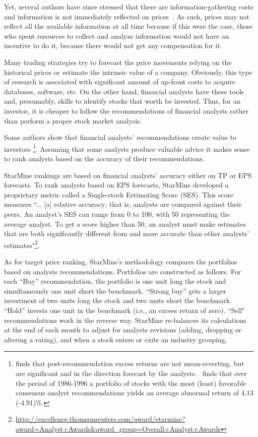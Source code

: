 \documentclass[12pt,a4paper]{article}\usepackage[]{graphicx}\usepackage[]{color}
\begin{document}
Yet, several authors have since stressed that  there are information-gathering costs and information is not immediately reflected on prices~\citep{grossman1980iie}. As such, prices may not  reflect all the available information at all time because if this were the case, those who spent resources to collect and analyze   information would not have an incentive to do it, because there would not get any compensation for it.

Many trading strategies try to forecast the price movements relying on the historical prices or estimate the intrinsic value of a company. Obviously, this type of research is associated with significant amount of up-front costs to acquire databases, software, etc. On the other hand, financial analysts have these tools and, presumably, skills to identify  stocks that worth be invested. Thus, for an investor, it is cheaper to follow the recommendations of financial analysts rather than perform a proper stock market analysis.


Some authors show that financial analysts' recommendations create value to investors \citep{womack1996,barber2001}\footnote{\cite{womack1996} finds that  post-recommendation excess returns are not mean-reverting, but are significant and in the direction forecast by the analysts.~\cite{barber2001} finds that over the period of 1986-1996 a portfolio of stocks with the most (least) favorable consensus analyst recommendations yields an average abnormal return of 4.13 (-4.91)\%.}. Assuming that some analysts produce valuable advice it makes sense to rank analysts based on the accuracy of their recommendations.

StarMine rankings are based on financial analysts' accuracy either on TP or EPS forecasts. To rank analysts based on EPS forecasts, StarMine developed a proprietary metric called a Single-stock Estimating Score (SES). This score measures ``... [a] relative accuracy; that is, analysts are compared against their peers. An analyst's SES can range from 0 to 100, with 50 representing the average analyst. To get a score higher than 50, an analyst must make estimates that are both significantly different from and more accurate than other analysts' estimates"\footnote{\url{http://excellence.thomsonreuters.com/award/starmine?award=Analyst+Awards&award_group=Overall+Analyst+Awards}}.


As for target price ranking, StarMine's methodology compares the portfolios based on analysts recommendations. Portfolios are constructed as follows. For each ``Buy'' recommendation, the portfolio is one unit long the stock and simultaneously one unit short the benchmark. ``Strong buy'' gets a larger investment of two units long the stock and two units short the benchmark. ``Hold'' invests one unit in the benchmark (i.e., an excess return of zero). ``Sell" recommendations work in the reverse way. StarMine re-balances its calculations at the end of each month to adjust for analysts revisions (adding, dropping or altering a rating), and when a stock enters or exits an industry grouping.
\end{document}
